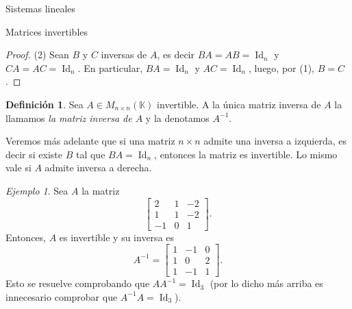 \documentclass[a4paper,12pt,twoside,spanish,reqno]{amsbook}
\numberwithin{equation}{section}
\theoremstyle{definition}
\newtheorem{definicion}[teorema]{Definici\'on}
\theoremstyle{remark}
\newtheorem*{ejemplo*}{Ejemplo}
\newcommand{\Id}{\operatorname{Id}}
\newcommand{\K}{\mathbb K}
\begin{document}
\begin{chapter}{Sistemas lineales}
\begin{section}{Matrices invertibles}
\begin{proof}
                (2) Sean $B$ y $C$ inversas de $A$, es decir $BA=AB=\Id_n$ y  $CA=AC=\Id_n$. En particular, $BA=\Id_n$ y $AC= \Id_n$, luego, por (1), $B=C$.  
            \end{proof}
            
            
            
            \begin{definicion}
                Sea $A\in M_{n\times n}(\K)$ invertible. A la única matriz inversa de $A$ la llamamos \textit{la matriz inversa de $A$} y la denotamos $A^{-1}$.
            \end{definicion}
            
            Veremos más adelante que si una matriz $n \times n$ admite una inversa a izquierda,  es decir si existe $B$ tal que $BA=\Id_n$, entonces la matriz es invertible. Lo mismo vale si $A$  admite inversa a derecha.
            
            \begin{ejemplo*}
                Sea $A$ la matriz 
                \begin{equation*}
                \begin{bmatrix} 2&1&-2\\ 1&1&-2\\ -1&0&1
                \end{bmatrix}.
                \end{equation*}
                Entonces,  $A$ es invertible y su inversa es
                \begin{equation*}
                A^{-1} = \begin{bmatrix} 1&-1&0\\ 1&0&2\\ 1&-1&1
                \end{bmatrix}.
                \end{equation*}
                Esto se resuelve comprobando que $AA^{-1}=\Id_3$ (por lo dicho más arriba es innecesario comprobar que $A^{-1}A=\Id_3$).
            \end{ejemplo*} 
            

\end{section}
\end{chapter}
\end{document}
